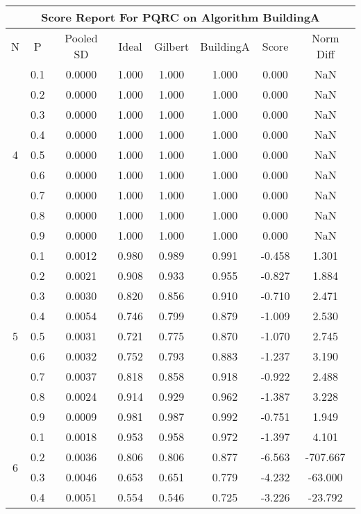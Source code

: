 \documentclass[11pt,a4paper]{report}
\begin{document}
\begin{longtable}{ | c | c || c | c | c | c | c | c | }
\hline
\multicolumn{8}{|c|}{ Score Report For PQRC on Algorithm BuildingA} \\
\hline
N & P & Pooled SD &  Ideal &  Gilbert & BuildingA  & Score & Norm Diff \\
 \hline
 \hline
 \endhead
\multirow{9}{*}{4} & 0.1 & 0.0000 & 1.000 & 1.000 & 1.000 & 0.000 & NaN \\
 & 0.2 & 0.0000 & 1.000 & 1.000 & 1.000 & 0.000 & NaN \\
 & 0.3 & 0.0000 & 1.000 & 1.000 & 1.000 & 0.000 & NaN \\
 & 0.4 & 0.0000 & 1.000 & 1.000 & 1.000 & 0.000 & NaN \\
 & 0.5 & 0.0000 & 1.000 & 1.000 & 1.000 & 0.000 & NaN \\
 & 0.6 & 0.0000 & 1.000 & 1.000 & 1.000 & 0.000 & NaN \\
 & 0.7 & 0.0000 & 1.000 & 1.000 & 1.000 & 0.000 & NaN \\
 & 0.8 & 0.0000 & 1.000 & 1.000 & 1.000 & 0.000 & NaN \\
 & 0.9 & 0.0000 & 1.000 & 1.000 & 1.000 & 0.000 & NaN \\
 \hline
\multirow{9}{*}{5} & 0.1 & 0.0012 & 0.980 & 0.989 & 0.991 & -0.458 & 1.301 \\
 & 0.2 & 0.0021 & 0.908 & 0.933 & 0.955 & -0.827 & 1.884 \\
 & 0.3 & 0.0030 & 0.820 & 0.856 & 0.910 & -0.710 & 2.471 \\
 & 0.4 & 0.0054 & 0.746 & 0.799 & 0.879 & -1.009 & 2.530 \\
 & 0.5 & 0.0031 & 0.721 & 0.775 & 0.870 & -1.070 & 2.745 \\
 & 0.6 & 0.0032 & 0.752 & 0.793 & 0.883 & -1.237 & 3.190 \\
 & 0.7 & 0.0037 & 0.818 & 0.858 & 0.918 & -0.922 & 2.488 \\
 & 0.8 & 0.0024 & 0.914 & 0.929 & 0.962 & -1.387 & 3.228 \\
 & 0.9 & 0.0009 & 0.981 & 0.987 & 0.992 & -0.751 & 1.949 \\
 \hline
\multirow{9}{*}{6} & 0.1 & 0.0018 & 0.953 & 0.958 & 0.972 & -1.397 & 4.101 \\
 & 0.2 & 0.0036 & 0.806 & 0.806 & 0.877 & -6.563 & -707.667 \\
 & 0.3 & 0.0046 & 0.653 & 0.651 & 0.779 & -4.232 & -63.000 \\
 & 0.4 & 0.0051 & 0.554 & 0.546 & 0.725 & -3.226 & -23.792 \\

\end{longtable}
\end{document}
